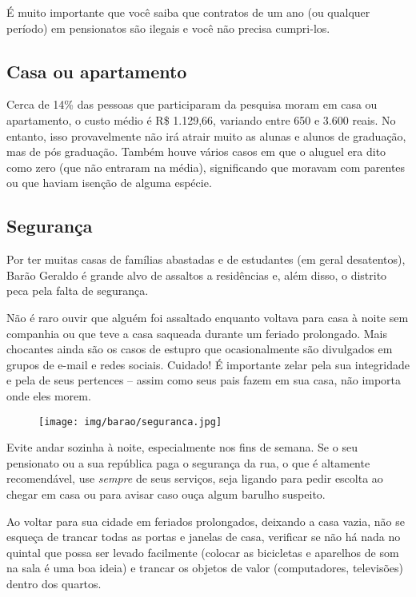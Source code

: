 É muito importante que você saiba que contratos de um ano (ou qualquer período)
em pensionatos são ilegais e você não precisa cumpri-los.

\subsection{Casa ou apartamento}

Cerca de 14\% das pessoas que participaram da pesquisa moram em casa ou
apartamento, o custo médio é R\$ 1.129,66, variando entre 650 e 3.600 reais.
No entanto, isso provavelmente não irá atrair muito as alunas e alunos de
graduação, mas de pós graduação. Também houve vários casos em que o aluguel era
dito como zero (que não entraram na média), significando que moravam com
parentes ou que haviam isenção de alguma espécie.

\subsection{Segurança}

Por ter muitas casas de famílias abastadas e de estudantes (em geral
desatentos), Barão Geraldo é grande alvo de assaltos a residências e, além
disso, o distrito peca pela falta de segurança.

Não é raro ouvir que alguém foi assaltado enquanto voltava para casa à noite
sem companhia ou que teve a casa saqueada durante um feriado prolongado. Mais
chocantes ainda são os casos de estupro que ocasionalmente são divulgados em
grupos de e-mail e redes sociais. Cuidado! É importante zelar pela sua
integridade e pela de seus pertences -- assim como seus pais fazem em sua casa,
não importa onde eles morem.

\begin{figure}[h!]
    \centering
    \texttt{[image: img/barao/seguranca.jpg]}
\end{figure}

Evite andar sozinha à noite, especialmente nos fins de semana. Se o seu
pensionato ou a sua república paga o segurança da rua, o que é altamente
recomendável, use \emph{sempre} de seus serviços, seja ligando para pedir
escolta ao chegar em casa ou para avisar caso ouça algum barulho suspeito.

Ao voltar para sua cidade em feriados prolongados, deixando a casa vazia, não
se esqueça de trancar todas as portas e janelas de casa, verificar se não há
nada no quintal que possa ser levado facilmente (colocar as bicicletas e
aparelhos de som na sala é uma boa ideia) e trancar os objetos de valor
(computadores, televisões) dentro dos quartos.


